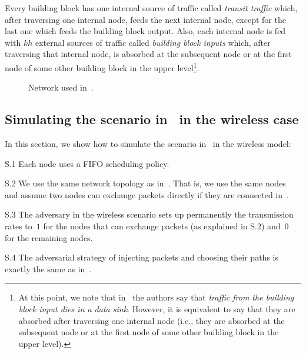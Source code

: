 \documentclass[journal,twocolumn]{./IEEEtran}
\begin{document}
Every building block has one internal source of traffic called \emph{transit traffic} which, after traversing one internal node, feeds the next internal node, except for the last one which feeds the building block output. Also, each internal node is fed with $kh$ external sources of traffic called \emph{building block inputs} which, after traversing that internal node, is absorbed at the subsequent node or at the first node of some other building block in the upper level\footnote{At this point, we note that in~\cite{DBLP:journals/ton/BennettBCCB02} the authors say that \emph{traffic from the building block input dies in a data sink}. However, it is equivalent to say that they are absorbed after traversing one internal node (i.e., they are absorbed at the subsequent node or at the first node of some other building block in the upper level).}.

\begin{figure*}
\begin{center}
\label{aaa}
\label{bbb}
\caption{Network used in~\cite{DBLP:journals/ton/BennettBCCB02}.}
\label{fig:aaa}
\end{center} 
\end{figure*}


\subsection{Simulating the scenario in~\cite{DBLP:journals/ton/BennettBCCB02} in the wireless case}
\label{wireless:scenario}

In this section, we show how to simulate the scenario in~\cite{DBLP:journals/ton/BennettBCCB02} in the wireless model:

\begin{description} 
\item{S.1}
Each node uses a FIFO scheduling policy.

\item{S.2}
We use the same network topology as in~\cite{DBLP:journals/ton/BennettBCCB02}. That is, we use the same nodes and assume two nodes can exchange packets directly if they are connected in~\cite{DBLP:journals/ton/BennettBCCB02}.


\item{S.3}
The adversary in the wireless scenario sets up permanently the transmission rates to~$1$ for the nodes that  can exchange packets (as explained in S.2) and~$0$ for the remaining nodes.

\item{S.4}
The adversarial strategy of injecting packets and choosing their paths is exactly the same as in~\cite{DBLP:journals/ton/BennettBCCB02}.

\end{description}
\end{document}
